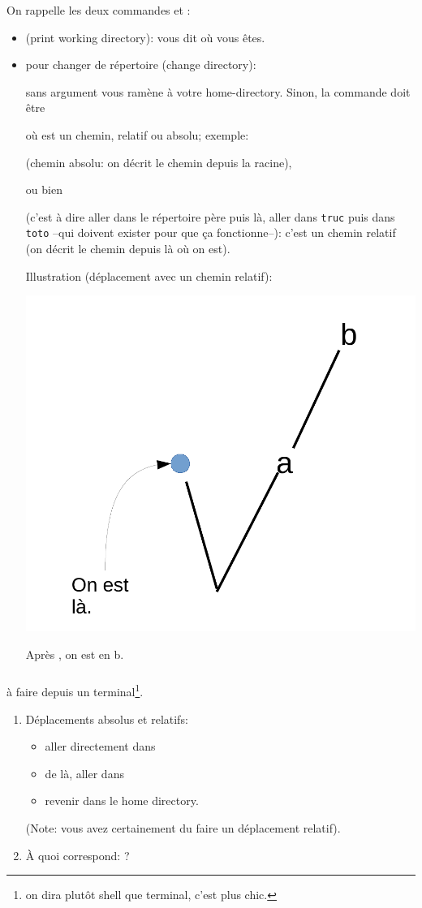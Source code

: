 On rappelle les deux  commandes  et :
\begin{itemize}
\item  {} (print working directory): vous dit où vous êtes.
\item  {} pour changer de répertoire (change directory):
  
   sans argument vous ramène à votre home-directory. Sinon, la
  commande doit être


  où  est un
  chemin, relatif ou absolu; exemple:

   (chemin absolu: on décrit le chemin depuis
  la racine),

  ou bien

   (c'est à dire aller dans le répertoire père
  puis là, aller 
  dans \texttt{truc} puis  dans \texttt{toto} --qui doivent exister
  pour que ça fonctionne--): c'est un chemin relatif (on décrit le
  chemin depuis là où on est).

  Illustration (déplacement avec un chemin relatif): 

  \begin{center}
  \includegraphics[width=0.25\linewidth]{images/mv.png}
  
  Après , on est en b. 
  
  \end{center}
  
\end{itemize}

\subsubsection*{\exos}
à faire depuis un terminal\footnote{on dira plutôt \og shell\fg{} que
  terminal, c'est plus chic.}.
\begin{enumerate}
  \item Déplacements absolus et relatifs:
      \begin{itemize}
      \item aller directement dans 
      \item de là, aller dans 
      \item revenir dans le home directory.
      \end{itemize}
      (Note: vous avez certainement du faire un déplacement relatif).
    \item \`A quoi correspond: ?
\end{enumerate}
